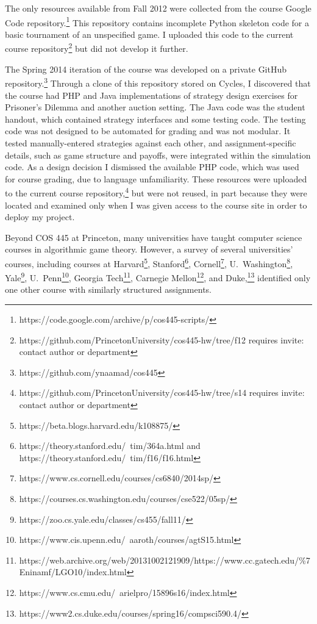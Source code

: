 \documentclass[pageno]{jpaper}
\begin{document}
The only resources available from Fall 2012 were collected from the course Google Code repository.\footnote{https://code.google.com/archive/p/cos445-scripts/}
This repository contains incomplete Python skeleton code for a basic tournament of an unspecified game.
I uploaded this code to the current course repository\footnote{https://github.com/PrincetonUniversity/cos445-hw/tree/f12 requires invite: contact author or department} but did not develop it further.

The Spring 2014 iteration of the course was developed on a private GitHub repository.\footnote{https://github.com/ynaamad/cos445}
Through a clone of this repository stored on Cycles, I discovered that the course had PHP and Java implementations of strategy design exercises for Prisoner's Dilemma and another auction setting.
The Java code was the student handout, which contained strategy interfaces and some testing code.
The testing code was not designed to be automated for grading and was not modular.
It tested manually-entered strategies against each other, and assignment-specific details, such as game structure and payoffs, were integrated within the simulation code.
As a design decision I dismissed the available PHP code, which was used for course grading, due to language unfamiliarity.
These resources were uploaded to the current course repository,\footnote{https://github.com/PrincetonUniversity/cos445-hw/tree/s14 requires invite: contact author or department} but were not reused, in part because they were located and examined only when I was given access to the course site in order to deploy my project.

Beyond COS 445 at Princeton, many universities have taught computer science courses in algorithmic game theory.
However, a survey of several universities' courses, including courses at Harvard\footnote{https://beta.blogs.harvard.edu/k108875/}, Stanford\footnote{https://theory.stanford.edu/~tim/364a.html and https://theory.stanford.edu/~tim/f16/f16.html}, Cornell\footnote{https://www.cs.cornell.edu/courses/cs6840/2014sp/}, U.\ Washington\footnote{https://courses.cs.washington.edu/courses/cse522/05sp/}, Yale\footnote{https://zoo.cs.yale.edu/classes/cs455/fall11/}, U.\ Penn\footnote{https://www.cis.upenn.edu/~aaroth/courses/agtS15.html}, Georgia Tech\footnote{https://web.archive.org/web/20131002121909/https://www.cc.gatech.edu/\%7Eninamf/LGO10/index.html}, Carnegie Mellon\footnote{https://www.cs.cmu.edu/~arielpro/15896s16/index.html}, and Duke,\footnote{https://www2.cs.duke.edu/courses/spring16/compsci590.4/} identified only one other course with similarly structured assignments.
\end{document}

